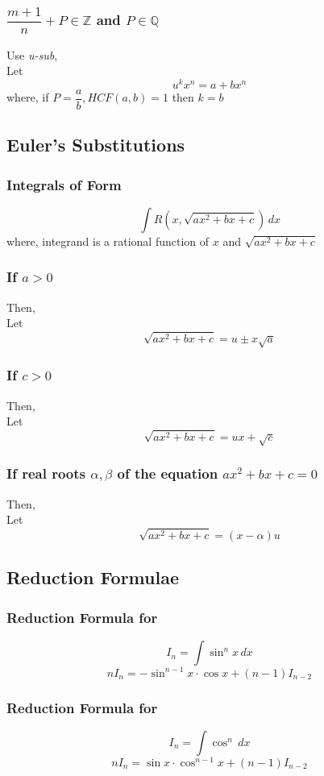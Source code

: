 \documentclass{article}
\begin{document}
\subsubsection{$\dfrac{m+1}{n}+P \in \mathbb{Z}$ and $P \in \mathbb{Q}$}
Use \textit{u-sub},
\\
Let $$u^kx^n=a+bx^n$$
where, if $P=\dfrac{a}{b}, HCF(a,b)=1$ then $k=b$

\subsection{Euler's Substitutions}
\subsubsection*{Integrals of Form }
$$\displaystyle\int R(x,\sqrt{ax^2+bx+c}) \, dx$$
where, integrand is a rational function of $x$ and $\sqrt{ax^2+bx+c}$
\subsubsection{If $a>0$}
Then,
\\
Let $$\sqrt{ax^2+bx+c}=u\pm x\sqrt{a}$$
\subsubsection{If $c>0$}
Then,
\\
Let $$\sqrt{ax^2+bx+c}=ux + \sqrt{c}$$
\subsubsection{If real roots $\alpha, \beta$ of the equation $ax^2+bx+c=0$}
Then,
\\
Let $$\sqrt{ax^2+bx+c}=(x-\alpha)u$$

\subsection{Reduction Formulae}
\subsubsection{Reduction Formula for }
$$I_{n}=\displaystyle\int \sin^n x \, dx$$
$$nI_{n}=-{\sin^{n-1} x \cdot \cos x}+(n-1)I_{n-2}$$
\subsubsection{Reduction Formula for }
$$I_{n}=\displaystyle\int \cos^{n} \, dx$$
$$nI_{n}=\sin x \cdot \cos^{n-1}x + (n-1)I_{n-2}$$
\end{document}
